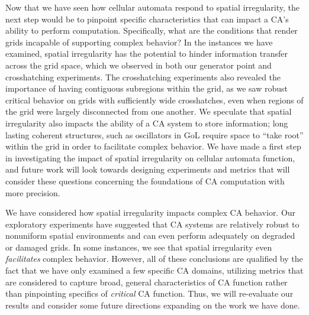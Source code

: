 \documentclass[a4paper,11pt]{article}
\begin{document}
Now that we have seen how cellular automata respond to spatial irregularity, the next step would be to pinpoint specific characteristics that can impact a CA's ability to perform computation. Specifically, what are the conditions that render grids incapable of supporting complex behavior? In the instances we have examined, spatial irregularity has the potential to hinder information transfer across the grid space, which we observed in both our generator point and crosshatching experiments. The crosshatching experiments also revealed the importance of having contiguous subregions within the grid, as we saw robust critical behavior on grids with sufficiently wide crosshatches, even when regions of the grid were largely disconnected from one another. We speculate that spatial irregularity also impacts the ability of a CA system to store information; long lasting coherent structures, such as oscillators in GoL require space to ``take root'' within the grid in order to facilitate complex behavior. We have made a first step in investigating the impact of spatial irregularity on cellular automata function, and future work will look towards designing experiments and metrics that will consider these questions concerning the foundations of CA computation with more precision.



We have considered how spatial irregularity impacts complex CA behavior. Our exploratory experiments have suggested that CA systems are relatively robust to nonuniform spatial environments and can even perform adequately on degraded or damaged grids. In some instances, we see that spatial irregularity even \textit{facilitates} complex behavior. However, all of these conclusions are qualified by the fact that we have only examined a few specific CA domains, utilizing metrics that are considered to capture broad, general characteristics of CA function rather than pinpointing specifics of \textit{critical} CA function. Thus, we will re-evaluate our results and consider some future directions expanding on the work we have done.

\end{document}
